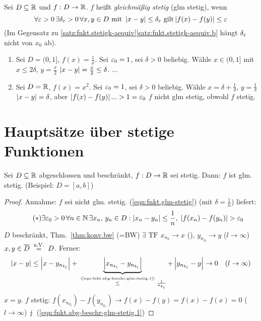 \documentclass[12pt]{scrreprt}
\begin{document}
\begin{dfn}\label{dfn:fnkt.glm-stetig}
Sei $D\subseteq\mathbb{R}$ und $f: D\rightarrow\mathbb{R}$. $f$ heißt \emph{gleichmäßig stetig} (glm stetig), wenn
\begin{equation}\label{eqn:fnkt.glm-stetig}
\forall\varepsilon>0\,\exists\delta_\varepsilon > 0\,\forall x, y\in D\text{ mit }\left\lvert x-y\right\lvert \le \delta_\varepsilon\text{ gilt} \left\lvert f(x)-f(y)\right\lvert \le \varepsilon
\end{equation}
(Im Gegensatz zu \ref{satz:fnkt.stetigk-aequiv}\ref{satz:fnkt.stetigk-aequiv.b} hängt $\delta_\varepsilon$ nicht von $x_0$ ab).
\end{dfn}

\begin{bsp}\label{bsp:fnkt.glm-stetig}
\begin{enumerate}
\item Sei $D = (0, 1]$, $f(x)=\frac{1}{x}$. Sei $\varepsilon_0=1$, sei $\delta > 0$ beliebig. Wähle $x\in(0, 1]$ mit
$x\le 2\delta$, $y=\frac{x}{2}$ \folgt $\left\lvert x-y\right\lvert = \frac{x}{2} \le \delta$. ...\label{bsp:fnkt.glm-stetig.a}
\item Sei $D=\mathbb{R}$, $f(x)=x^2$. Sei $\varepsilon_0 = 1$, sei $\delta > 0$ beliebig. Wähle $x=\delta + \frac{1}{\delta}$, $y=\frac{1}{\delta}$
\folgt $\left\lvert x-y\right\lvert=\delta$, aber $\left\lvert f(x)-f(y)\right\lvert ... > 1 = \varepsilon_0$
\folgt $f$ nicht glm stetig, obwohl $f$ stetig.\label{bsp:fnkt.glm-stetig.b}
\end{enumerate}
\end{bsp}

\section{Hauptsätze über stetige Funktionen}
\label{sec:fnkt.hauptsaetze}

\begin{thm}\label{thm:fnkt.abg-beschr-glm-stetig}
Sei $D\subseteq\mathbb{R}$ abgeschlossen und beschränkt, $f: D\rightarrow\mathbb{R}$ sei stetig. Dann: $f$ ist glm. stetig. (Beispiel: $D=[a, b]$)
\end{thm}
\begin{proof}
Annahme: $f$ sei nicht glm. stetig. (\ref{eqn:fnkt.glm-stetig}) (mit $\delta=\frac{1}{n}$) liefert: 
\begin{equation}\label{eqn:fnkt.abg-beschr-glm-stetig.1}\tag{$*$}
\exists \varepsilon_0 >0\,\forall n\in\mathbb{N}\,\exists x_n,\,y_n\in D: \left\lvert x_n - y_n\right\lvert \le \frac{1}{n},\;\left\lvert f(x_n)-f(y_n)\right\lvert > \varepsilon_0
\end{equation}
$D$ beschränkt, Thm.~\ref{thm:konv.bw} (=BW) \folgt $\exists \text{ TF }x_{n_k} \to x$ (\kinf), $y_{n_{k_l}}\to y$ ($l\to\infty$) \folgt
$x, y \in \abg{D} \nach{=}{n.V.} D$. Ferner: 
\[\abs{x-y} \le \abs{x-y_{n_{k_l}}} + \underbrace{\abs{x_{n_{k_l}}-y_{n_{k_l}}}}_{\nach{\le}{(\ref{eqn:fnkt.abg-beschr-glm-stetig.1})} \frac{1}{n_{k_l}}} + \abs{y_{n_{k_l}} - y} \to 0\quad (l\to\infty)\]
 $x=y$. 
$f$ stetig: $f(x_{n_{k_l}}) - f(y_{n_{k_l}}) \to f(x)-f(y) = f(x) - f(x) = 0$ ($l\to\infty$) $\lightning$ (\ref{eqn:fnkt.abg-beschr-glm-stetig.1})
\end{proof}
\end{document}
